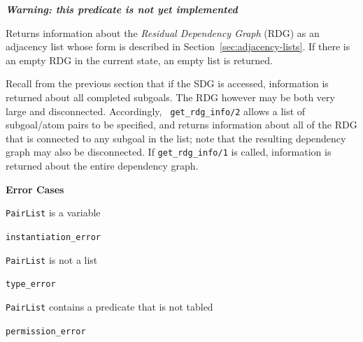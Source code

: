 \begin{description}
%

{\bf {\em Warning: this predicate is not yet implemented}}

Returns information about the {\em Residual Dependency Graph} (RDG) as
an adjacency list whose form is described in Section~\ref{sec:adjacency-lists}.
%
If there is an empty RDG in the current state, an empty list
is returned.

Recall from the previous section that if the SDG is accessed,
information is returned about all completed subgoals.  The RDG however
may be both very large and disconnected.  Accordingly, {\tt
  get\_rdg\_info/2} allows a list of subgoal/atom pairs to be
specified, and returns information about all of the RDG that is
connected to any subgoal in the list; note that the resulting
dependency graph may also be disconnected.  If {\tt get\_rdg\_info/1}
is called, information is returned about the entire dependency graph.

{\bf Error Cases}
\bi
\item {\tt PairList} is a variable
\bi
\item 	{\tt instantiation\_error}
\ei
\item {\tt PairList} is not a list
\bi
\item 	{\tt type\_error}
\ei
\item {\tt PairList} contains a predicate that is not tabled
\bi
\item 	{\tt permission\_error}
\ei
\ei

%


\end{description}
